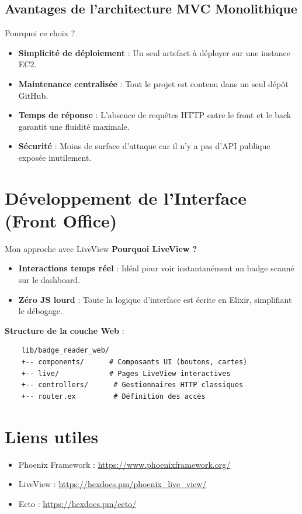 \subsection{Avantages de l'architecture MVC Monolithique}

\begin{for_you}{Pourquoi ce choix ?}
    \begin{itemize}
        \item \textbf{Simplicité de déploiement} : Un seul artefact à déployer sur une instance EC2.
        \item \textbf{Maintenance centralisée} : Tout le projet est contenu dans un seul dépôt GitHub.
        \item \textbf{Temps de réponse} : L'absence de requêtes HTTP entre le front et le back garantit une fluidité maximale.
        \item \textbf{Sécurité} : Moins de surface d'attaque car il n'y a pas d'API publique exposée inutilement.
    \end{itemize}
\end{for_you}

\section{Développement de l'Interface (Front Office)}

\begin{for_you}{Mon approche avec LiveView}
    \textbf{Pourquoi LiveView ?}
    \begin{itemize}
        \item \textbf{Interactions temps réel} : Idéal pour voir instantanément un badge scanné sur le dashboard.
        \item \textbf{Zéro JS lourd} : Toute la logique d'interface est écrite en Elixir, simplifiant le débogage.
    \end{itemize}

    \textbf{Structure de la couche Web} :
    \begin{verbatim}
    lib/badge_reader_web/
    +-- components/      # Composants UI (boutons, cartes)
    +-- live/            # Pages LiveView interactives
    +-- controllers/      # Gestionnaires HTTP classiques
    +-- router.ex         # Définition des accès
    \end{verbatim}
\end{for_you}

\section{Liens utiles}

\begin{itemize}
    \item Phoenix Framework : \url{https://www.phoenixframework.org/}
    \item LiveView : \url{https://hexdocs.pm/phoenix_live_view/}
    \item Ecto : \url{https://hexdocs.pm/ecto/}
\end{itemize}